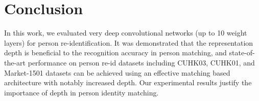 \documentclass[10pt,journal,twocolumn]{IEEEtran}
\begin{document}
\section{Conclusion}\label{sec:con}

In this work, we evaluated very deep convolutional networks (up to 10 weight layers) for person re-identification. It was demonstrated that the representation depth is beneficial to the recognition accuracy in person matching, and state-of-the-art performance on person re-id datasets including CUHK03, CUHK01, and Market-1501 datasets can be achieved using an effective matching based architecture \cite{FPNN,JointRe-id} with notably increased depth. Our experimental results justify the importance of depth in person identity matching.


\ifCLASSOPTIONcaptionsoff
  \newpage
\fi




\small

\end{document}
